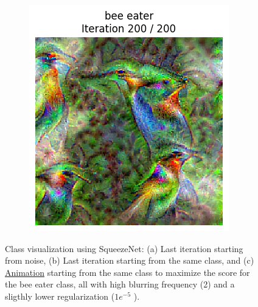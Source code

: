 \begin{figure}[H]
\begin{subfigure}{.33\textwidth}
        \includegraphics[width=\linewidth]{SqueezeNet/bird_animated_same_init_img_reg++_last_frame.png}
        \caption{}
        \label{fig:class_viz_start_image:png}
    \end{subfigure}%
    \begin{subfigure}{.33\textwidth}
        \centering
        \begin{frame}{}
        \end{frame}
        \caption{} %
        \label{fig:class_viz_start_image:vid}
    \end{subfigure}
    \caption{Class visualization using SqueezeNet: (a) Last iteration starting from noise, (b) Last iteration starting from the same class, and (c) \href{gifs/SqueezeNet_bird_animated_same_init_img_reg++.gif}{Animation} starting from the same class to maximize the score for the bee eater class, all with high blurring frequency (2) and a sligthly lower regularization ($ 1e^{-5} $ ).}
    \label{fig:class_viz_start_image}
\end{figure}

